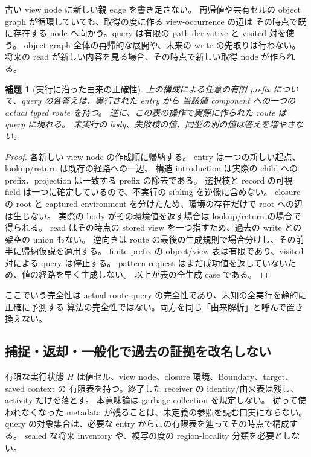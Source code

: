 \documentclass[11pt,a4paper]{article}
\newtheorem{lemma}[definition]{補題}
\begin{document}
古い view node に新しい親 edge を書き足さない。
再帰値や共有セルの object graph が循環していても、取得の度に作る view-occurrence の辺は
その時点で既に存在する node へ向かう。query は有限の path derivative と visited 対を使う。
object graph 全体の再帰的な展開や、未来の write の先取りは行わない。
将来の read が新しい内容を見る場合、その時点で新しい取得 node が作られる。

\begin{lemma}[実行に沿った由来の正確性]
\label{lem:source-route}
上の構成による任意の有限 prefix について、query の各答えは、実行された entry から
当該値 component への一つの actual typed route を持つ。
逆に、この表の操作で実際に作られた route は query に現れる。
未実行の body、失敗枝の値、同型の別の値は答えを増やさない。
\end{lemma}
\begin{proof}
各新しい view node の作成順に帰納する。
entry は一つの新しい起点、lookup/return は既存の経路への一辺、
構造 introduction は実際の child への prefix、projection は一致する prefix の除去である。
選択枝と record の可視 field は一つに確定しているので、不実行の sibling を逆像に含めない。
closure の root と captured environment を分けたため、環境の存在だけで root への辺は生じない。
実際の body がその環境値を返す場合は lookup/return の場合で得られる。
read はその時点の stored view を一つ指すため、過去の write との架空の union もない。
逆向きは route の最後の生成規則で場合分けし、その前半に帰納仮説を適用する。
finite prefix の object/view 表は有限であり、visited 対による query は停止する。
pattern request はまだ成功値を返していないため、値の経路を早く生成しない。
以上が表の全生成 case である。
\end{proof}

ここでいう完全性は actual-route query の完全性であり、未知の全実行を静的に正確に予測する
算法の完全性ではない。両方を同じ「由来解析」と呼んで置き換えない。

\subsection{捕捉・返却・一般化で過去の証拠を改名しない}

有限な実行状態 \(H\) は値セル、view node、closure 環境、Boundary、target、saved context の
有限表を持つ。終了した receiver の identity/由来表は残し、activity だけを落とす。
本意味論は garbage collection を規定しない。
従って使われなくなった metadata が残ることは、未定義の参照を読む口実にならない。
query の対象集合は、必要な entry からこの有限表を辿ってその時点で構成する。
sealed な将来 inventory や、複写の度の region-locality 分類を必要としない。
\end{document}
